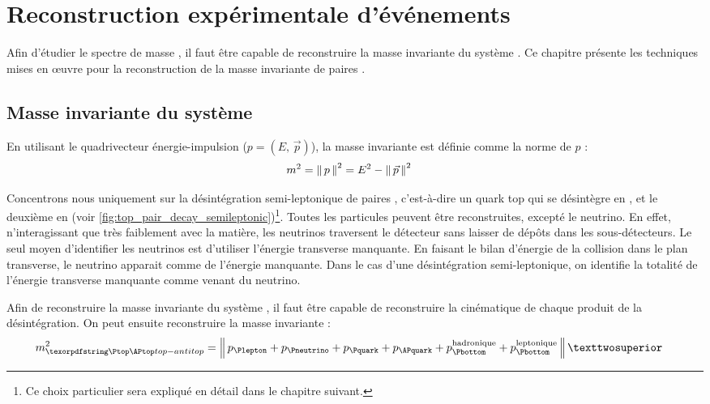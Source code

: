 \chapter{Reconstruction expérimentale d'événements \ttbar} \label{chap:mtt_reco}

Afin d'étudier le spectre de masse \mtt, il faut être capable de reconstruire la masse invariante du système \ttbar. Ce chapitre présente les techniques mises en œuvre pour la reconstruction de la masse invariante de paires \ttbar.

\section{Masse invariante du système \ttbar}

En utilisant le quadrivecteur énergie-impulsion ($p = \left(E,\,\vec{p}\right)$), la masse invariante est définie comme la norme de $p$ :
\begin{align*}
  m^2 &= \left\lVert \, p \, \right\rVert^2 = E^2 - \left\lVert \, \vec{p} \, \right\rVert^2
\end{align*}

Concentrons nous uniquement sur la désintégration semi-leptonique de paires \ttbar, c'est-à-dire un quark top qui se désintègre en \Plepton{}\Pneutrino{}\Pbottom, et le deuxième en \Pbottom{}\Pquark{}\APquark (voir \cref{fig:top_pair_decay_semileptonic})\footnote{Ce choix particulier sera expliqué en détail dans le chapitre suivant.}. Toutes les particules peuvent être reconstruites, excepté le neutrino. En effet, n'interagissant que très faiblement avec la matière, les neutrinos traversent le détecteur sans laisser de dépôts dans les sous-détecteurs. Le seul moyen d'identifier les neutrinos est d'utiliser l'énergie transverse manquante. En faisant le bilan d'énergie de la collision dans le plan transverse, le neutrino apparait comme de l'énergie manquante. Dans le cas d'une désintégration \ttbar semi-leptonique, on identifie la totalité de l'énergie transverse manquante comme venant du neutrino.

Afin de reconstruire la masse invariante du système \ttbar, il faut être capable de reconstruire la cinématique de chaque produit de la désintégration. On peut ensuite reconstruire la masse invariante \ttbar :
\begin{align} \label{eq:invariant_mass_tt}
  m_{\ttbar}^2 &= \norm{ p_{\Plepton} + p_{\Pneutrino} + p_{\Pquark} + p_{\APquark} + p_{\Pbottom}^{\text{hadronique}} + p_{\Pbottom}^\text{leptonique} }²
\end{align}

